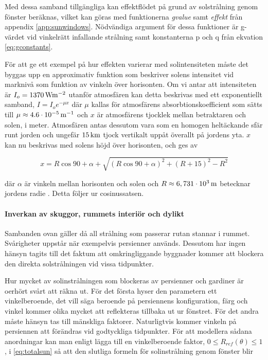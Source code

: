 Med dessa samband tillgängliga kan effektflödet på grund av solstrålning genom fönster beräknas, vilket kan göras med funktionerna \textit{gvalue} samt \textit{effekt} från appendix \ref{app:sunwindows}. Nödvändiga argument för dessa funktioner är g-värdet vid vinkelrätt infallande strålning samt konstanterna p och q från ekvation \eqref{eq:gconstants}. %

För att ge ett exempel på hur effekten varierar med solintensiteten måste det byggas upp en approximativ funktion som beskriver solens intensitet vid marknivå som funktion av vinkeln över horisonten. Om vi antar att intensiteten är $I_o = \unit[1370]{Wm^{-2}}$ utanför atmosfären kan detta beskrivas med ett exponentiellt samband, $I = I_oe^{-\mu x}$ där $\mu$ kallas för atmosfärens absorbtionskoefficient som sätts till $\mu\approx \unit[4.6\cdot 10^{-5}]{m^{-1}}$ och $x$ är atmosfärens tjocklek mellan betraktaren och solen, i meter. Atmosfären antas dessutom vara som en homogen heltäckande sfär runt jorden och ungefär $\unit[15]{km}$ tjock vertikalt uppåt överallt på jordens yta. $x$ kan nu beskrivas med solens höjd över horisonten, och ges av

\begin{equation}
x = R\cos{90+\alpha} + \sqrt{\left(R\cos{90+\alpha}\right)^2 + \left( R+15\right)^2 - R^2}
\end{equation}

där $\alpha$ är vinkeln mellan horisonten och solen och $R\approx\unit[6,731\cdot 10^3]{m}$ betecknar jordens radie \cite{physicshandbook}. Detta följer ur cosinussatsen. %

\paragraph{Inverkan av skuggor, rummets interiör och dylikt}

Sambanden ovan gäller då all strålning som passerar rutan stannar i rummet. Svårigheter uppstår när exempelvis persienner används. Dessutom har ingen hänsyn tagits till det faktum att omkringliggande byggnader kommer att blockera den direkta solstrålningen vid vissa tidpunkter.

Hur mycket av solinstrålningen som blockeras av persienner och gardiner är oerhört svårt att räkna ut. För det första hyser den parametern ett vinkelberoende, det vill säga beroende på persiennens konfiguration, färg och vinkel kommer olika mycket att reflekteras tillbaka ut ur fönstret. För det andra måste hänsyn tas till mänskliga faktorer. Naturligtvis kommer vinkeln på persiennen att förändras vid godtyckliga tidpunkter. För att modellera sådana anordningar kan man enligt \cite{ASHRAE09} lägga till en vinkelberoende faktor, $0 \le R_{ref}\left( \theta \right) \le 1$, i \eqref{eq:totalsun} så att den slutliga formeln för solinstrålning genom fönster blir


